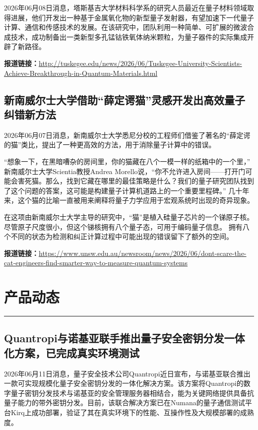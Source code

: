 \documentclass[12pt,a4paper]{ctexart}
\begin{document}
2026年06月08日消息，塔斯基吉大学材料科学系的研究人员最近在量子材料领域取得进展，他们开发出一种基于金属氧化物的新型量子发射器，有望加速下一代量子计算、通信和传感技术的发展。在该研究中，团队利用一种简单、可扩展的微波合成技术，成功制备出一类新型多孔锰钴铁氧体纳米颗粒，为量子器件的实际集成开辟了新路径。

\noindent\textbf{报道链接：}\url{http://tuskegee.edu/news/2026/06/Tuskegee-University-Scientists-Achieve-Breakthrough-in-Quantum-Materials.html}

\subsection{ 新南威尔士大学借助“薛定谔猫”灵感开发出高效量子纠错新方法 }

2026年06月07日消息，新南威尔士大学悉尼分校的工程师们借鉴了著名的“薛定谔的猫”类比，提出了一种更高效的方法，用于消除量子计算中的错误。

“想象一下，在黑暗嘈杂的房间里，你的猫藏在八个一模一样的纸箱中的一个里，” 新南威尔士大学Scientia教授Andrea Morello说，“你不允许进入房间——打开门可能会害死猫。那么，找到它藏在哪里的最佳策略是什么？我们的量子研究团队找到了这个问题的答案，这可能是构建量子计算机道路上的一个重要里程碑。”
几十年来，这个猫的比喻一直被用来阐释将量子力学应用于宏观系统时出现的奇异现象。

在这项由新南威尔士大学主导的研究中，“猫”是植入硅量子芯片的一个锑原子核。尽管原子尺度很小，但这个锑核拥有八个量子态，可用于编码量子信息。
拥有八个不同的状态为检测和纠正计算过程中可能出现的错误留下了额外的空间。


\noindent\textbf{报道链接：}\url{https://www.unsw.edu.au/newsroom/news/2026/06/dont-scare-the-cat-engineers-find-smarter-way-to-measure-quantum-systems}


\newpage
\section{产品动态}
\vspace{-0.5em}
\noindent\rule{\linewidth}{1.5pt}

\subsection{ Quantropi与诺基亚联手推出量子安全密钥分发一体化方案，已完成真实环境测试 }

2026年06月11日消息，量子安全技术公司Quantropi近日宣布，与诺基亚联合推出一款可实现规模化量子安全密钥分发的一体化解决方案。该方案将Quantropi的数字量子密钥分发技术与诺基亚的安全管理服务器相结合，能为关键网络提供具备抗量子能力的带外密钥分发。目前，该联合解决方案已在Numana的量子通信测试平台Kirq上成功部署，验证了其在真实环境下的性能、互操作性及大规模部署的成熟度。
\end{document}
